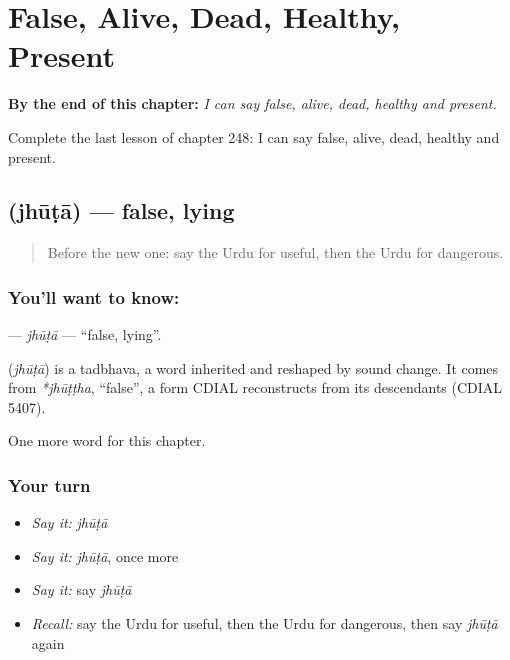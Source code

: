 
\chapter{False, Alive, Dead, Healthy, Present}
\label{ch:ur-false-alive-dead-healthy-present}

\begin{chapteropening}
\textbf{By the end of this chapter:} \emph{I can say false, alive, dead, healthy and present.}

Complete the last lesson of chapter 248: I can say false, alive, dead, healthy and present.
\end{chapteropening}

\section[\texorpdfstring{\ur{جھوٹا} (jhūṭā)}{جھوٹا (jhūṭā)}]{ (jhūṭā) — false, lying}

\label{lesson:UR-C248-jhuta}



\begin{quote}
Before the new one: say the Urdu for useful, then the Urdu for dangerous.
\end{quote}

\subsection*{You'll want to know: }
\textbf{} — \emph{jhūṭā} — \textquotedblleft{}false, lying\textquotedblright{}.

\begin{cousinweb}
\textbf{} (\emph{jhūṭā}) is a tadbhava, a word inherited and reshaped by sound change. It comes from \emph{*jhūṭṭha}, \textquotedblleft{}false\textquotedblright{}, a form CDIAL reconstructs from its descendants (CDIAL 5407).
\end{cousinweb}

\begin{grammarlens}[title={What you've built}]
One more word for this chapter.
\end{grammarlens}

\subsection*{Your turn}
\begin{itemize}
\raggedright
  \item \emph{Say it:} \emph{jhūṭā}
  \item \emph{Say it:} \emph{jhūṭā}, once more
  \item \emph{Say it:} say \emph{jhūṭā}
  \item \emph{Recall:} say the Urdu for useful, then the Urdu for dangerous, then say \emph{jhūṭā} again
\end{itemize}

